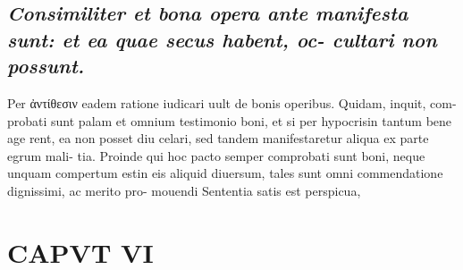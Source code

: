 \documentclass{article}
\begin{document}
\begin{pages}
\subsection*{\textit{Consimiliter et bona opera ante manifesta sunt: et ea quae secus habent, oc- cultari non possunt. }}\pstart Per ἀντίθεσιν eadem ratione iudicari uult de bonis operibus. Quidam, inquit, com- probati sunt palam et omnium testimonio boni, et si per hypocrisin tantum bene age rent, ea non posset diu celari, sed tandem manifestaretur aliqua ex parte egrum mali- tia. Proinde qui hoc pacto semper comprobati sunt boni, neque unquam compertum estin eis aliquid diuersum, tales sunt omni commendatione dignissimi, ac merito pro- mouendi Sententia satis est perspicua,  \pend
\endnumbering\beginnumbering\section{CAPVT VI}
{}

\end{pages}
\end{document}
